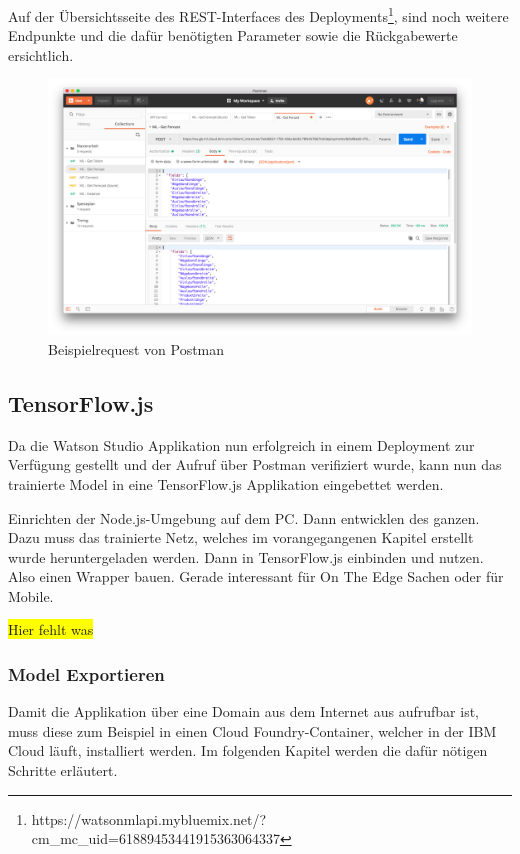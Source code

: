 Auf der Übersichtsseite des REST-Interfaces des
Deployments\footnote{https://watson\-ml\-api.mybluemix.net/?cm\_mc\_uid=61889453441915363064337}, sind noch weitere
Endpunkte und die dafür benötigten Parameter sowie die Rückgabewerte ersichtlich.

\begin{figure}[h]
    \centering
    \includegraphics[scale=0.26]{images/kapitel_3/deployment_postman.png}
    \caption{Beispielrequest von Postman}
    \label{fig:umsetzung_deployment_postman}
\end{figure}

\subsection{TensorFlow.js}
Da die Watson Studio Applikation nun erfolgreich in einem Deployment zur Verfügung gestellt und der Aufruf über
Postman verifiziert wurde, kann nun das trainierte Model in eine TensorFlow.js Applikation eingebettet werden.

Einrichten der Node.js-Umgebung auf dem PC. Dann entwicklen des ganzen. Dazu muss das trainierte Netz, welches im
vorangegangenen Kapitel erstellt wurde heruntergeladen werden. Dann in TensorFlow.js einbinden und nutzen. Also einen
Wrapper bauen. Gerade interessant für On The Edge Sachen oder für Mobile.

\colorbox{yellow}{Hier fehlt was}

\subsubsection{Model Exportieren}
Damit die Applikation über eine Domain aus dem Internet aus aufrufbar ist, muss diese zum Beispiel in einen Cloud
Foundry-Container, welcher in der IBM Cloud läuft, installiert werden. Im folgenden Kapitel werden die dafür nötigen
Schritte erläutert.

